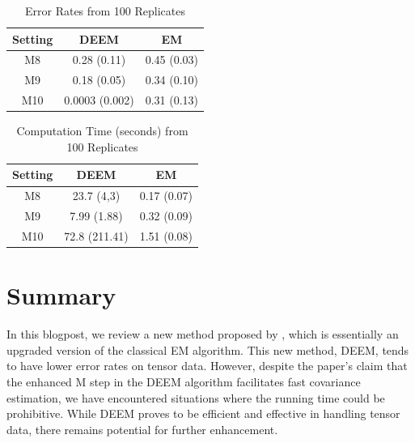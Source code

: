 \documentclass[11pt]{article}
\begin{document}
\begin{table}[H]
    \centering
    \begin{tabular}{|c|cc|}
    \hline
       Setting  &  DEEM & EM \\
       \hline
         M8 & 0.28 (0.11) & 0.45 (0.03) \\
         M9 &  0.18 (0.05) & 0.34 (0.10) \\
         M10 &  0.0003 (0.002) & 0.31 (0.13) \\ 
    \hline
    \end{tabular}
    \caption{Error Rates from 100 Replicates}
    \label{tab:err2}
\end{table}

\begin{table}[H]
    \centering
    \begin{tabular}{|c|cc|}
    \hline
       Setting  &  DEEM & EM \\
       \hline
         M8 & 23.7 (4,3) & 0.17 (0.07) \\
         M9 &  7.99 (1.88) & 0.32 (0.09) \\
         M10 &  72.8 (211.41) & 1.51 (0.08) \\ 
    \hline
    \end{tabular}
    \caption{Computation Time (seconds) from 100 Replicates}
    \label{tab:time2}
\end{table}

\section{Summary}

In this blogpost, we review a new method proposed by \cite{mai2022DEEM}, which is essentially an upgraded version of the classical EM algorithm. This new method, DEEM, tends to have lower error rates on tensor data. However, despite the paper's claim that the enhanced M step in the DEEM algorithm facilitates fast covariance estimation, we have encountered situations where the running time could be prohibitive. While DEEM proves to be efficient and effective in handling tensor data, there remains potential for further enhancement.


\begin{singlespace}
	
	
\end{singlespace}
\end{document}
